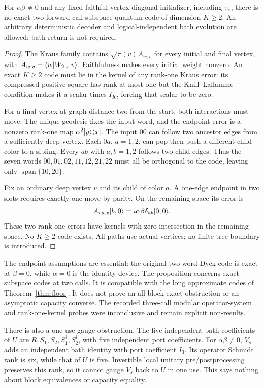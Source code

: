 \begin{proposition}\label{prop:twonocode}
For $\alpha\beta\ne0$ and any fixed faithful vertex-diagonal initializer, including $\tau_\pi$, there is no exact two-forward-call subspace quantum code of dimension $K\ge2$. An arbitrary deterministic decoder and logical-independent bath evolution are allowed; bath return is not required.
\end{proposition}
\begin{proof}
The Kraus family contains $\sqrt{\pi(v)}A_{w,v}$ for every initial and final vertex, with
$A_{w,v}=\langle w\rvert W_{2,s}\lvert v\rangle$. Faithfulness makes every initial weight nonzero. An exact $K\ge2$ code must lie in the kernel of any rank-one Kraus error: its compressed positive square has rank at most one but the Knill--Laflamme condition makes it a scalar times $I_K$, forcing that scalar to be zero.

For a final vertex at graph distance two from the start, both interactions must move. The unique geodesic fixes the input word, and the endpoint error is a nonzero rank-one map $\alpha^2\lvert y\rangle\langle x\rvert$. The input $00$ can follow two ancestor edges from a sufficiently deep vertex. Each $0a$, $a=1,2$, can pop then push a different child color to a sibling. Every $ab$ with $a,b=1,2$ follows two child edges. Thus the seven words $00,01,02,11,12,21,22$ must all be orthogonal to the code, leaving only $\operatorname{span}\{10,20\}$.

Fix an ordinary deep vertex $v$ and its child of color $a$. A one-edge endpoint in two slots requires exactly one move by parity. On the remaining space its error is
\[
 A_{va,v}\lvert b,0\rangle=i\alpha\beta\delta_{ab}\lvert 0,0\rangle.
\]
These two rank-one errors have kernels with zero intersection in the remaining space. No $K\ge2$ code exists. All paths use actual vertices; no finite-tree boundary is introduced.
\end{proof}

The endpoint assumptions are essential: the original two-word Dyck code is exact at $\beta=0$, while $\alpha=0$ is the identity device. The proposition concerns exact subspace codes at two calls. It is compatible with the long approximate codes of Theorem~\ref{thm:floor}. It does not prove an all-block exact obstruction or an asymptotic capacity converse. The recorded three-call modular operator-system and rank-one-kernel probes were inconclusive and remain explicit non-results.

There is also a one-use gauge obstruction. The five independent bath coefficients of $U$ are $R,S_1,S_2,S_1^\dagger,S_2^\dagger$, with five independent port coefficients. For $\alpha\beta\ne0$, $V_s$ adds an independent bath identity with port coefficient $I_3$. Its operator Schmidt rank is six, while that of $U$ is five. Invertible local unitary pre/postprocessing preserves this rank, so it cannot gauge $V_s$ back to $U$ in one use. This says nothing about block equivalences or capacity equality.

